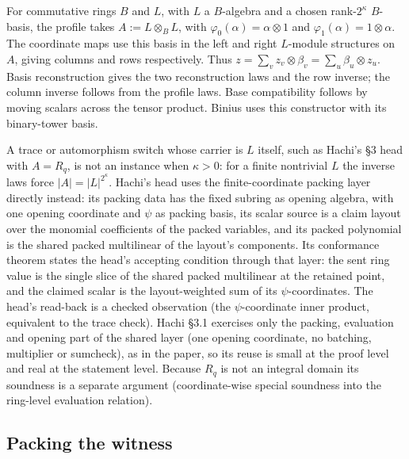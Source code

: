 \begin{definition}
  \leanok
  \label{def:tensor_product_profile}
  For commutative rings $B$ and $L$, with $L$ a $B$-algebra and a chosen rank-$2^\kappa$
  $B$-basis, the profile takes $A := L \otimes_B L$, with
  $\varphi_0(\alpha) = \alpha \otimes 1$ and $\varphi_1(\alpha) = 1 \otimes \alpha$.
  The coordinate maps use this basis in the left and right $L$-module structures on $A$,
  giving columns and rows respectively. Thus
  $z = \sum_v z_v \otimes \beta_v = \sum_u \beta_u \otimes z_u$.
  Basis reconstruction gives the two reconstruction laws and the row inverse; the column
  inverse follows from the profile laws. Base compatibility follows by moving scalars
  across the tensor product. Binius uses this constructor with its binary-tower basis.
\end{definition}

A trace or automorphism switch whose carrier is $L$ itself, such as Hachi's \S3 head
\cite{NOZ26} with $A = R_q$, is not an instance when $\kappa > 0$: for a finite nontrivial $L$ the
inverse laws force $\lvert A\rvert = \lvert L\rvert^{2^\kappa}$. Hachi's head uses the finite-coordinate
packing layer directly instead: its packing data has the fixed subring as opening algebra, with one
opening coordinate and $\psi$ as packing basis, its scalar source is a claim layout over the
monomial coefficients of the packed variables, and its packed polynomial is the shared packed
multilinear of the layout's components. Its conformance theorem states the head's accepting
condition through that layer: the sent ring value is the single slice of the shared packed
multilinear at the retained point, and the claimed scalar is the layout-weighted sum of its
$\psi$-coordinates. The head's read-back is a checked observation (the $\psi$-coordinate inner
product, equivalent to the trace check). Hachi \S3.1 exercises only the packing, evaluation and
opening part of the shared layer (one opening coordinate, no batching, multiplier or sumcheck), as
in the paper, so its reuse is small at the proof level and real at the statement level.
Because $R_q$ is not an integral domain its soundness is a separate argument (coordinate-wise
special soundness into the ring-level evaluation relation).

\subsection{Packing the witness}

